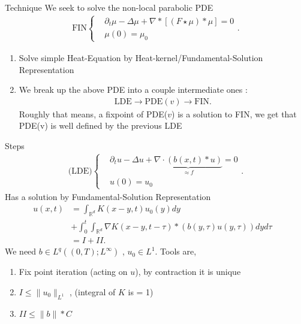 \documentclass[10pt]{beamer}
\begin{document}
\begin{frame}{Technique}
  We seek to solve the non-local parabolic PDE
\begin{align*}
  \text{FIN}\begin{cases}
    &\partial_t \mu  - \Delta \mu  + \nabla * [(F\star \mu)*\mu ] = 0 \\
    &\mu(0) = \mu_0
  \end{cases}
.\end{align*}
\begin{enumerate}
 \item Solve simple Heat-Equation by Heat-kernel/Fundamental-Solution Representation 
 \item We break up the above PDE into a couple intermediate ones : 
   \begin{align*}
    \text{LDE} \to \text{PDE}(v) \to \text{FIN}
   .\end{align*}
   Roughly that means, a fixpoint of PDE($v$) is a solution to FIN, we get that PDE(v) is
   well defined by the previous LDE 
\end{enumerate}
\end{frame}
\begin{frame}{Steps} 
   \begin{align*}
      \text{(LDE)}\begin{cases}
        &\partial_t u  - \Delta  u + \underbrace{\nabla \cdot (b(x,t)*u)}_{\approx f} = 0\\
        &u(0) = u_0
      \end{cases} 
   .\end{align*}
   Has a solution by Fundamental-Solution Representation 
   \begin{align*}
     u(x,t) &= \int_{\mathbb{R}^{d} }K(x-y,t)u_{0}(y) dy  &\\
            &+ \int_{0}^{t} \int_{\mathbb{R}^{d} } \nabla K(x-y,t-\tau ) * (b(y,\tau )u(y,\tau ) ) dy d\tau \\
            &= I + II
   .\end{align*}
  We need $b \in  L^{q}((0,T);L^{\infty} )$ , $u_{0} \in  L^{1}$. Tools are, 
  \begin{enumerate}
    \item Fix point iteration (acting on $u$), by contraction it is unique 
    \item $I \le \|u_{0}\|_{L^{1} }$ , (integral of $K$ is = 1)
    \item $II \le \|b\|*C $ 
  \end{enumerate}
\end{frame}
\end{document}
